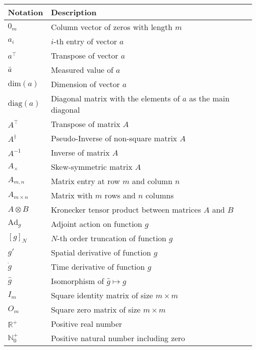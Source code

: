 \begin{spacing}{0.9}
\begin{multicols}{2}
\begin{table}[H]
\begin{tabular}{p{2.5cm} p{4cm}}
    
    \end{tabular}
\end{table}


\begin{table}[H]
\centering
    \begin{tabular}{p{1.5cm} p{5cm}} \hline
    \textbf{Notation}    &   \textbf{Description}\\ \hline
    $0_m$    & Column vector of zeros with length $m$ \\
    $a_i$ & $i$-th entry of vector $a$ \\
    $a^\top$ & Transpose of vector $a$ \\
    $\Bar{a}$ & Measured value of $a$  \\
    $\text{dim}(a)$ & Dimension of vector $a$ \\
    $\text{diag}(a)$ & Diagonal matrix with the elements of $a$ as the main diagonal\\
    $A^\top$ & Transpose of matrix $A$ \\
    $A^\dagger$ & Pseudo-Inverse of non-square matrix $A$ \\
    $A^{-1}$ & Inverse of matrix $A$ \\
    $A_\times$ & Skew-symmetric matrix $A$ \\
    $A_{m,n}$ & Matrix entry at row $m$ and column $n$ \\
    $A_{m \times n}$ & Matrix with $m$ rows and $n$ columns \\
    $A \otimes B$ & Kronecker tensor product between matrices $A$ and $B$ \\
    $\text{Ad}_g$ & Adjoint action on function $g$\\
    $[g]_N$ & $N$-th order truncation of function $g$\\ 
    $g'$ & Spatial derivative of function $g$ \\
    $\dot{g}$ & Time derivative of function $g$ \\
    $\hat{g}$ & Isomorphism of $\hat{g} \longmapsto g$ \\
    $I_m$    & Square identity matrix of size $m \times m$ \\
    $O_m$    & Square zero matrix of size $m \times m$ \\
    $\mathbb{R}^+$ & Positive real number\\
    $\mathbb{N}^+_0$ & Positive natural number including zero\\ \hline

    \end{tabular}
\end{table}



\end{multicols}
\end{spacing}
